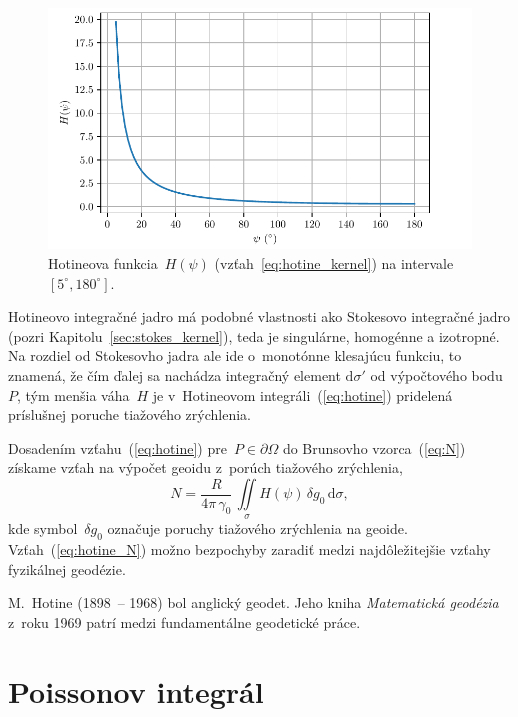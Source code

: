 \documentclass[a4paper, 12pt]{book}
\newcommand{\diff}{\mathrm d}
\begin{document}
\begin{figure}[bt]
\centering
\includegraphics{./fig-hotine-kernel.pdf}
\caption{Hotineova funkcia~$H(\psi)$ (vzťah~\ref{eq:hotine_kernel}) na 
intervale~$[5^\circ, 180^\circ]$.}
\label{fig:hotine_kernel}
\end{figure}

Hotineovo integračné jadro má podobné vlastnosti ako Stokesovo integračné jadro 
(pozri Kapitolu~\ref{sec:stokes_kernel}), teda je singulárne, homogénne 
a izotropné.  Na rozdiel od Stokesovho jadra ale ide o~monotónne klesajúcu 
funkciu, to znamená, že čím ďalej sa nachádza integračný element $\diff\sigma'$ 
od výpočtového bodu~$P$, tým menšia váha~$H$ je v~Hotineovom 
integráli~(\ref{eq:hotine}) pridelená príslušnej poruche tiažového zrýchlenia.

Dosadením vzťahu~(\ref{eq:hotine}) pre~$P \in \partial\Omega$ do Brunsovho 
vzorca~(\ref{eq:N}) získame vzťah na výpočet geoidu z~porúch tiažového 
zrýchlenia,
%
\begin{equation}
\label{eq:hotine_N}
N = \frac{R}{4\pi \, \gamma_0} \, \iint\limits_{\sigma} H(\psi) \, \delta g_0 
\, \diff \sigma{,}
\end{equation}
%
kde symbol~$\delta g_0$ označuje poruchy tiažového zrýchlenia na geoide.  
Vzťah~(\ref{eq:hotine_N}) možno bezpochyby zaradiť medzi najdôležitejšie vzťahy 
fyzikálnej geodézie.

M.~Hotine (1898~-- 1968) bol anglický geodet.  Jeho kniha \textit{Matematická 
geodézia} z~roku 1969 patrí medzi fundamentálne geodetické práce.

\section{Poissonov integrál}
\label{sec:poisson_integral}
\end{document}
